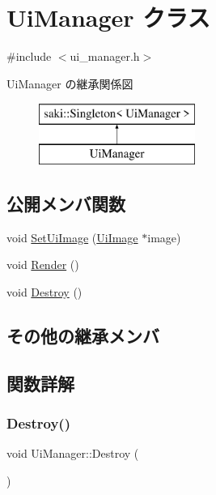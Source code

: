 \hypertarget{class_ui_manager}{}\section{Ui\+Manager クラス}
\label{class_ui_manager}


{\ttfamily \#include $<$ui\+\_\+manager.\+h$>$}

Ui\+Manager の継承関係図\begin{figure}[H]
\begin{center}
\leavevmode
\includegraphics[height=2.000000cm]{class_ui_manager}
\end{center}
\end{figure}
\subsection*{公開メンバ関数}
\begin{DoxyCompactItemize}
\item 
void \mbox{\hyperlink{class_ui_manager_a13f50b379bf2405061d461dd427190fa}{Set\+Ui\+Image}} (\mbox{\hyperlink{class_ui_image}{Ui\+Image}} $\ast$image)
\item 
void \mbox{\hyperlink{class_ui_manager_a502cad1dd064757aea72ccf1377699b4}{Render}} ()
\item 
void \mbox{\hyperlink{class_ui_manager_ab4c659643580171b6c0db341e88e037c}{Destroy}} ()
\end{DoxyCompactItemize}
\subsection*{その他の継承メンバ}


\subsection{関数詳解}
\mbox{\label{class_ui_manager_ab4c659643580171b6c0db341e88e037c}} 
\subsubsection{\texorpdfstring{Destroy()}{Destroy()}}
{\footnotesize\ttfamily void Ui\+Manager\+::\+Destroy (\begin{DoxyParamCaption}{ }\end{DoxyParamCaption})\hspace{0.3cm}{\ttfamily [inline]}}

